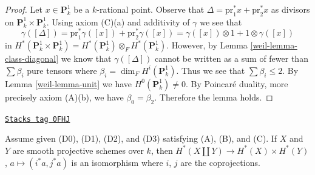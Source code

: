 \begin{proof}

Let $x \in \mathbf{P}^1_k$ be a $k$-rational point. Observe that
$\Delta = \text{pr}_1^*x + \text{pr}_2^*x$ as divisors on
$\mathbf{P}^1_k \times \mathbf{P}^1_k$. Using axiom (C)(a)
and additivity of $\gamma$ we see that
$$
\gamma([\Delta]) =
\text{pr}_1^*\gamma([x]) +
\text{pr}_2^*\gamma([x]) =
\gamma([x]) \otimes 1 + 1 \otimes \gamma([x])
$$
in $H^*(\mathbf{P}^1_k \times \mathbf{P}^1_k) =
H^*(\mathbf{P}^1_k) \otimes_F H^*(\mathbf{P}^1_k)$.
However, by Lemma \ref{weil-lemma-class-diagonal}
we know that $\gamma([\Delta])$ cannot be written
as a sum of fewer than $\sum \beta_i$ pure tensors
where $\beta_i = \dim_F H^i(\mathbf{P}^1_k)$.
Thus we see that $\sum \beta_i \leq 2$.
By Lemma \ref{weil-lemma-unit} we have $H^0(\mathbf{P}^1_k) \not = 0$.
By Poincar\'e duality, more precisely axiom (A)(b),
we have $\beta_0 = \beta_2$. Therefore the lemma holds.
\end{proof}

\begin{lemma}
\label{weil-lemma-weil-additive}
\href{https://stacks.math.columbia.edu/tag/0FHJ}{\texttt{Stacks tag 0FHJ}}

Assume given (D0), (D1), (D2), and (D3) satisfying (A), (B), and (C).
If $X$ and $Y$ are smooth projective schemes over $k$, then
$H^*(X \amalg Y) \to H^*(X) \times H^*(Y)$,
$a \mapsto (i^*a, j^*a)$ is an isomorphism where $i$, $j$
are the coprojections.
\end{lemma}

